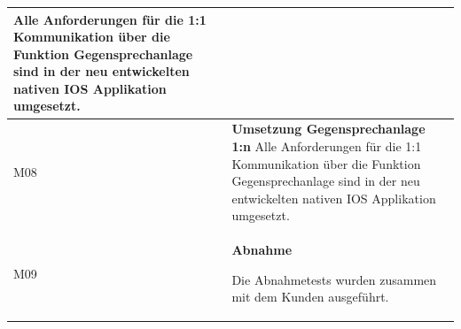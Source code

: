 \begin{table}[h]
\begin{tabular}{|l|p{15cm}|}
        Alle Anforderungen für die 1:1 Kommunikation über die Funktion Gegensprechanlage sind in der neu entwickelten nativen IOS Applikation umgesetzt. \\
        \hline

        M08         & \textbf{Umsetzung Gegensprechanlage 1:n}
        Alle Anforderungen für die 1:1 Kommunikation über die Funktion Gegensprechanlage sind in der neu entwickelten nativen IOS Applikation umgesetzt. \\
        \hline

        M09         & \textbf{Abnahme}

        Die Abnahmetests wurden zusammen mit dem Kunden ausgeführt. \\
        \hline



    \end{tabular}\label{tab:milestones}
\end{table}

\clearpage
